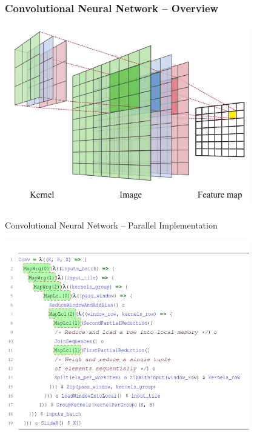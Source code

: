 \documentclass[10pt]{beamer}
\begin{document}
\begin{frame}
\frametitle{Convolutional Neural Network -- Overview}
\vspace{-.5cm}
    \begin{block}{}
        \begin{center}
            \includegraphics[width=0.8\textwidth]{../images/conv.pdf}
        \end{center}
    \end{block}
\vspace{-1.2cm}
\end{frame}

\begin{frame}{Convolutional Neural Network -- Parallel Implementation}
\vspace{-1.5cm}
    \begin{block}{}
        \begin{center}
            \includegraphics[width=0.8\textwidth]{../images/conv_expr_par.pdf}
        \end{center}
    \end{block}
\vspace{-1.2cm}
\end{frame}
\end{document}
